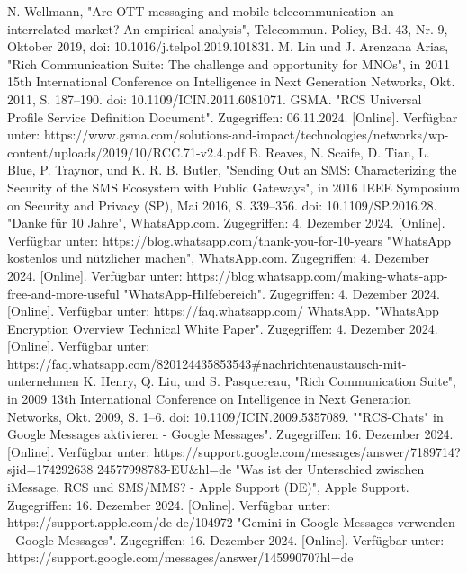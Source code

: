 \documentclass[conference]{IEEEtran}
\begin{document}
\begin{thebibliography}{00}
     N. Wellmann, "Are OTT messaging and mobile telecommunication an interrelated market? An empirical analysis", Telecommun. Policy, Bd. 43, Nr. 9, Oktober 2019, doi: 10.1016/j.telpol.2019.101831.
     M. Lin und J. Arenzana Arias, "Rich Communication Suite: The challenge and opportunity for MNOs", in 2011 15th International Conference on Intelligence in Next Generation Networks, Okt. 2011, S. 187–190. doi: 10.1109/ICIN.2011.6081071.
     GSMA. "RCS Universal Profile Service Definition Document". Zugegriffen: 06.11.2024. [Online]. Verfügbar unter: https://www.gsma.com/solutions-and-impact/technologies/networks/wp-content/uploads/2019/10/RCC.71-v2.4.pdf
     B. Reaves, N. Scaife, D. Tian, L. Blue, P. Traynor, und K. R. B. Butler, "Sending Out an SMS: Characterizing the Security of the SMS Ecosystem with Public Gateways", in 2016 IEEE Symposium on Security and Privacy (SP), Mai 2016, S. 339–356. doi: 10.1109/SP.2016.28.
     "Danke für 10 Jahre", WhatsApp.com. Zugegriffen: 4. Dezember 2024. [Online]. Verfügbar unter: https://blog.whatsapp.com/thank-you-for-10-years
     "WhatsApp kostenlos und nützlicher machen", WhatsApp.com. Zugegriffen: 4. Dezember 2024. [Online]. Verfügbar unter: https://blog.whatsapp.com/making-whats-app-free-and-more-useful
     "WhatsApp-Hilfebereich". Zugegriffen: 4. Dezember 2024. [Online]. Verfügbar unter: https://faq.whatsapp.com/
     WhatsApp. "WhatsApp Encryption Overview Technical White Paper". Zugegriffen: 4. Dezember 2024. [Online]. Verfügbar unter: https://faq.whatsapp.com/820124435853543\#nachrichtenaustausch-mit-unternehmen
     K. Henry, Q. Liu, und S. Pasquereau, "Rich Communication Suite", in 2009 13th International Conference on Intelligence in Next Generation Networks, Okt. 2009, S. 1–6. doi: 10.1109/ICIN.2009.5357089.
     ""RCS-Chats" in Google Messages aktivieren - Google Messages". Zugegriffen: 16. Dezember 2024. [Online]. Verfügbar unter: https://support.google.com/messages/answer/7189714?sjid=174292638
    24577998783-EU\&hl=de
     "Was ist der Unterschied zwischen iMessage, RCS und SMS/MMS? - Apple Support (DE)", Apple Support. Zugegriffen: 16. Dezember 2024. [Online]. Verfügbar unter: https://support.apple.com/de-de/104972
     "Gemini in Google Messages verwenden - Google Messages". Zugegriffen: 16. Dezember 2024. [Online]. Verfügbar unter: https://support.google.com/messages/answer/14599070?hl=de

\end{thebibliography}
\end{document}

